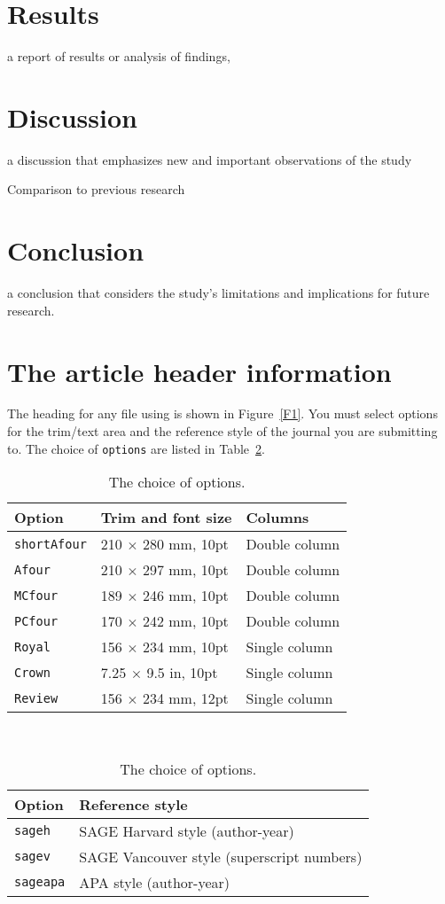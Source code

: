 \documentclass[Afour,sageh,times]{sagej}
\begin{document}
\section{Results} 
 a report of results or analysis of findings,

\section{Discussion} 
a discussion that emphasizes new and important observations of the study

Comparison to previous research

\section{Conclusion} 
a conclusion that considers the study’s limitations and implications for future research.

\section{The article header information}
The heading for any file using \textsf{\journalclass} is shown in
Figure~\ref{F1}. You must select options for the trim/text area and
the reference style of the journal you are submitting to.
The choice of \verb+options+ are listed in Table~\ref{T1}.

\begin{table}[h]
\small\sf\centering
\caption{The choice of options.\label{T1}}
\begin{tabular}{lll}
\toprule
Option&Trim and font size&Columns\\
\midrule
\texttt{shortAfour}& 210 $\times$ 280 mm, 10pt& Double column\\
\texttt{Afour} &210 $\times$ 297 mm, 10pt& Double column\\
\texttt{MCfour} &189 $\times$ 246 mm, 10pt& Double column\\
\texttt{PCfour} &170 $\times$ 242 mm, 10pt& Double column\\
\texttt{Royal} &156 $\times$ 234 mm, 10pt& Single column\\
\texttt{Crown} &7.25 $\times$ 9.5 in, 10pt&Single column\\
\texttt{Review} & 156 $\times$ 234 mm, 12pt & Single column\\
\bottomrule
\end{tabular}\\[10pt]
\begin{tabular}{ll}
\toprule
Option&Reference style\\
\midrule
\texttt{sageh}&SAGE Harvard style (author-year)\\
\texttt{sagev}&SAGE Vancouver style (superscript numbers)\\
\texttt{sageapa}&APA style (author-year)\\
\bottomrule
\end{tabular}
\end{table}
\end{document}
